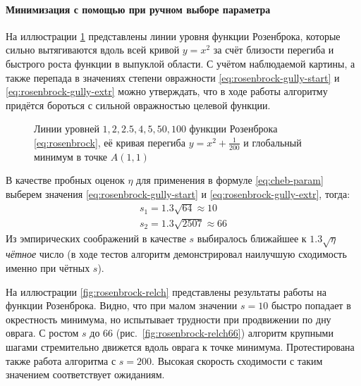 \paragraph{Минимизация с помощью \relch{} при ручном выборе параметра}

На иллюстрации \ref{fig:rosenbrock-contours} представлены линии уровня
функции Розенброка, которые сильно вытягиваются вдоль всей кривой
$y=x^2$ за счёт близости перегиба и быстрого роста функции в выпуклой
области. С учётом наблюдаемой картины, а также перепада в значениях
степени овражности \eqref{eq:rosenbrock-gully-start} и
\eqref{eq:rosenbrock-gully-extr} можно утверждать, что в ходе работы
алгоритму придётся бороться с сильной овражностью целевой функции.

\begin{figure}[thb]
  \centering
  \caption[Функция Розенброка]{Линии уровней $1, 2, 2.5, 4, 5, 50,
    100$ функции Розенброка \eqref{eq:rosenbrock}, её кривая перегиба
    $y=x^2+\frac{1}{200}$ и глобальный минимум в точке $A(1, 1)$}
  \label{fig:rosenbrock-contours}
\end{figure}

В качестве пробных оценок $\eta$ для применения в формуле
\eqref{eq:cheb-param} выберем значения
\eqref{eq:rosenbrock-gully-start} и \eqref{eq:rosenbrock-gully-extr}, тогда:
\begin{gather*}
  s_1 = 1.3 \sqrt{64} \approx 10 \\
  s_2 = 1.3 \sqrt{2507} \approx 66
\end{gather*}
Из эмпирических соображений в качестве $s$ выбиралось ближайшее к
$1.3\sqrt{\eta}$ \emph{чётное} число (в ходе тестов алгоритм
демонстрировал наилучшую сходимость именно при чётных $s$).

На иллюстрации \ref{fig:rosenbrock-relch} представлены результаты
работы \relch{} на функции Розенброка. Видно, что при малом значении
$s=10$ \relch{} быстро попадает в окрестность минимума, но испытывает
трудности при продвижении по дну оврага. С ростом $s$ до 66
(рис. \ref{fig:rosenbrock-relch66}) алгоритм крупными шагами
стремительно движется вдоль оврага к точке минимума. Протестирована
также работа алгоритма с $s=200$. Высокая скорость сходимости с таким
значением соответствует ожиданиям.

